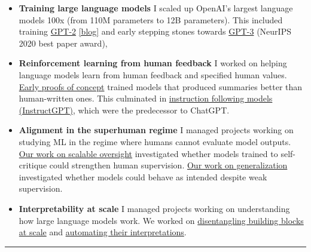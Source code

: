 \documentclass[11 pt]{article}
\begin{document}
\begin{itemize}

\item \textbf{Training large language models}
I scaled up OpenAI's largest language models 100x (from 110M parameters to 12B parameters).  %
This included training \href{https://d4mucfpksywv.cloudfront.net/better-language-models/language_models_are_unsupervised_multitask_learners.pdf}{GPT-2} \href{https://openai.com/blog/better-language-models/}{[blog]} and early stepping stones towards \href{https://arxiv.org/pdf/2005.14165.pdf}{GPT-3} (NeurIPS 2020 best paper award),

\item \textbf{Reinforcement learning from human feedback}
I worked on helping language models learn from human feedback and specified human values. \href{https://openai.com/blog/learning-to-summarize-with-human-feedback/}{Early proofs of concept} trained models that produced summaries better than human-written ones.  This culminated in \href{https://openai.com/blog/instruction-following/}{instruction following models (InstructGPT)}, which were the predecessor to ChatGPT.

\item \textbf{Alignment in the superhuman regime}
I managed projects working on studying ML in the regime where humans cannot evaluate model outputs. \href{https://openai.com/index/critiques/}{Our work on scalable oversight} investigated whether models trained to self-critique could strengthen human supervision.  \href{https://openai.com/index/weak-to-strong-generalization/}{Our work on generalization} investigated whether models could behave as intended despite weak supervision.

\item \textbf{Interpretability at scale}
I managed projects working on understanding how large language models work.  We worked on \href{https://openai.com/index/extracting-concepts-from-gpt-4/}{disentangling building blocks at scale} and \href{https://openai.com/index/language-models-can-explain-neurons-in-language-models/}{automating their interpretations}.


\end{itemize}
\hrule
\end{document}
